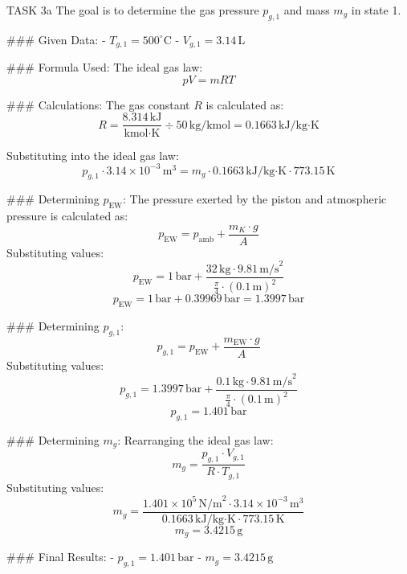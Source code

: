 TASK 3a  
The goal is to determine the gas pressure \( p_{g,1} \) and mass \( m_g \) in state 1.  

### Given Data:  
- \( T_{g,1} = 500^\circ\text{C} \)  
- \( V_{g,1} = 3.14 \, \text{L} \)  

### Formula Used:  
The ideal gas law:  
\[
pV = mRT
\]  

### Calculations:  
The gas constant \( R \) is calculated as:  
\[
R = \frac{8.314 \, \text{kJ}}{\text{kmol·K}} \div 50 \, \text{kg/kmol} = 0.1663 \, \text{kJ/kg·K}
\]  

Substituting into the ideal gas law:  
\[
p_{g,1} \cdot 3.14 \times 10^{-3} \, \text{m}^3 = m_g \cdot 0.1663 \, \text{kJ/kg·K} \cdot 773.15 \, \text{K}
\]  

### Determining \( p_{\text{EW}} \):  
The pressure exerted by the piston and atmospheric pressure is calculated as:  
\[
p_{\text{EW}} = p_{\text{amb}} + \frac{m_K \cdot g}{A}
\]  
Substituting values:  
\[
p_{\text{EW}} = 1 \, \text{bar} + \frac{32 \, \text{kg} \cdot 9.81 \, \text{m/s}^2}{\frac{\pi}{4} \cdot (0.1 \, \text{m})^2}
\]  
\[
p_{\text{EW}} = 1 \, \text{bar} + 0.39969 \, \text{bar} = 1.3997 \, \text{bar}
\]  

### Determining \( p_{g,1} \):  
\[
p_{g,1} = p_{\text{EW}} + \frac{m_{\text{EW}} \cdot g}{A}
\]  
Substituting values:  
\[
p_{g,1} = 1.3997 \, \text{bar} + \frac{0.1 \, \text{kg} \cdot 9.81 \, \text{m/s}^2}{\frac{\pi}{4} \cdot (0.1 \, \text{m})^2}
\]  
\[
p_{g,1} = 1.401 \, \text{bar}
\]  

### Determining \( m_g \):  
Rearranging the ideal gas law:  
\[
m_g = \frac{p_{g,1} \cdot V_{g,1}}{R \cdot T_{g,1}}
\]  
Substituting values:  
\[
m_g = \frac{1.401 \times 10^5 \, \text{N/m}^2 \cdot 3.14 \times 10^{-3} \, \text{m}^3}{0.1663 \, \text{kJ/kg·K} \cdot 773.15 \, \text{K}}
\]  
\[
m_g = 3.4215 \, \text{g}
\]  

### Final Results:  
- \( p_{g,1} = 1.401 \, \text{bar} \)  
- \( m_g = 3.4215 \, \text{g} \)